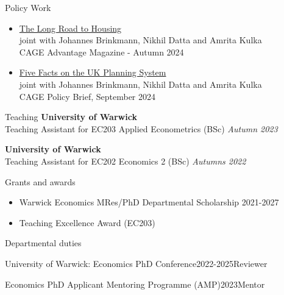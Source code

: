 \documentclass{cv_EB}
\begin{document}

\begin{rSection}{Policy Work}
\smallskip	
\begin{itemize}[leftmargin=0em]
\item {\small \href{https://warwick.ac.uk/fac/soc/economics/research/centres/cage/publications/uow_cage_mag_issue_17_digital_spread.pdf}{The Long Road to Housing} }
\\ {\small joint with Johannes Brinkmann, Nikhil Datta and Amrita Kulka}
\\ {\small CAGE Advantage Magazine - Autumn 2024}

\item {\small \href{https://warwick.ac.uk/fac/soc/economics/research/centres/cage/manage/news/five_facts_on_the_uk_planning_system_-_background_brief.pdf}{Five Facts on the UK Planning System}}
\\ {\small joint with Johannes Brinkmann, Nikhil Datta and Amrita Kulka}
\\ {\small CAGE Policy Brief, September 2024}
				
\end{itemize}
\end{rSection}

 \begin{rSection}{Teaching}
	{\bf University of Warwick}  \\
	Teaching Assistant for EC203 Applied Econometrics (BSc) \hfill {\em Autumn 2023} 
	
	\smallskip 
	
	{\bf University of Warwick}  \\
	Teaching Assistant for EC202 Economics 2 (BSc) \hfill {\em Autumns 2022} 
	
\end{rSection}
 

\newpage
\begin{rSection}{Grants and awards}
\begin{itemize}[leftmargin=*]
\item Warwick Economics MRes/PhD Departmental Scholarship 2021-2027
\item Teaching Excellence Award (EC203)

\end{itemize}
\end{rSection}


\begin{rSection}{Departmental duties}
    \begin{rSubsection}{University of Warwick: Economics PhD Conference}{2022-2025}{Reviewer}{}
    \end{rSubsection}
    \vspace{-1em}
    \begin{rSubsection}{Economics PhD Applicant Mentoring Programme (AMP)}{2023}{Mentor}{}
    \end{rSubsection}
\end{rSection}
\end{document}
